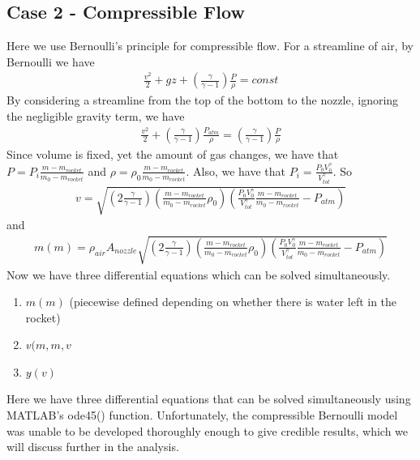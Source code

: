 \documentclass[12pt]{article}
\begin{document}
  \subsection{Case 2 - Compressible Flow}
  Here we use Bernoulli's principle for compressible flow. For a streamline of air, by Bernoulli we have
  \begin{align}
  \frac{v^{2}}{2} + gz + (\frac{\gamma}{\gamma-1})\frac{P}{\rho} = const
  \end{align}
  By considering a streamline from the top of the bottom to the nozzle, ignoring the negligible gravity term, we have
  \begin{align}
  \frac{v^{2}}{2} + (\frac{\gamma}{\gamma-1})\frac{P_{atm}}{\rho} = (\frac{\gamma}{\gamma-1})\frac{P}{\rho}
  \end{align}  
  Since volume is fixed, yet the amount of gas changes, we have that $P = P_{i}\frac{m-m_{rocket}}{m_{0}-m_{rocket}}$ and $\rho = \rho_{0}\frac{m-m_{rocket}}{m_{0}-m_{rocket}}$. Also, we have that $P_{i} = \frac{P_{0}V_{0}^{\gamma}}{V_{tot}^{\gamma}}$. So
  \begin{align}
  v = \sqrt{(2\frac{\gamma}{\gamma-1})(\frac{m-m_{rocket}}{m_{0}-m_{rocket}}\rho_{0})(\frac{P_{0}V_{0}^{\gamma}}{V_{tot}^{\gamma}}\frac{m-m_{rocket}}{m_{0}-m_{rocket}} - P_{atm})}
  \end{align} 
  and 
    \begin{align}
    m\dot{}(m) = \rho_{air}A_{nozzle}\sqrt{(2\frac{\gamma}{\gamma-1})(\frac{m-m_{rocket}}{m_{0}-m_{rocket}}\rho_{0})(\frac{P_{0}V_{0}^{\gamma}}{V_{tot}^{\gamma}}\frac{m-m_{rocket}}{m_{0}-m_{rocket}} - P_{atm})}
  \end{align} 
  Now we have three differential equations which can be solved simultaneously.
  \begin{enumerate}
  \item{$m\dot{}(m)$ (piecewise defined depending on whether there is water left in the rocket)}
  \item{$v\dot{}(m,m\dot{},v$}
  \item{$y\dot{}(v)$}
  \end{enumerate}
  Here we have three differential equations that can be solved simultaneously using MATLAB's ode45() function. Unfortunately, the compressible Bernoulli model was unable to be developed thoroughly enough to give credible results, which we will discuss further in the analysis.
\end{document}
